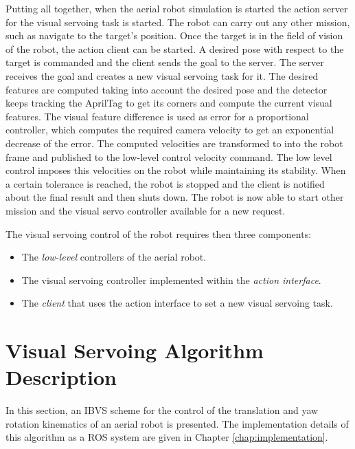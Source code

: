 Putting all together, when the aerial robot simulation is started the action server for the visual servoing task is started. The robot can carry out any other mission, such as navigate to the target's position. Once the target is in the field of vision of the robot, the action client can be started. A desired pose with respect to the target is commanded and the client sends the goal to the server. The server receives the goal and creates a new visual servoing task for it. The desired features are computed taking into account the desired pose and the detector keeps tracking the AprilTag to get its corners and compute the current visual features. The visual feature difference is used as error for a proportional controller, which computes the required camera velocity to get an exponential decrease of the error. The computed velocities are transformed to into the robot frame and published to the low-level control velocity command. The low level control imposes this velocities on the robot while maintaining its stability. When a certain tolerance is reached, the robot is stopped and the client is notified about the final result and then shuts down. The robot is now able to start other mission and the visual servo controller available for a new request.

\newpage

The visual servoing control of the robot requires then three components:

\begin{itemize}
	\item The \emph{low-level} controllers of the aerial robot.
	
	\item The visual servoing controller implemented within the \emph{action interface}.
	
	\item The \emph{client} that uses the action interface to set a new visual servoing task.
\end{itemize}

\section{Visual Servoing Algorithm Description}
\label{sec:vs-algorithm-description}

In this section, an IBVS scheme for the control of the translation and yaw rotation kinematics \cite{bourquardez_2009} of an aerial robot is presented. The implementation details of this algorithm as a ROS system are given in Chapter \ref{chap:implementation}. 

